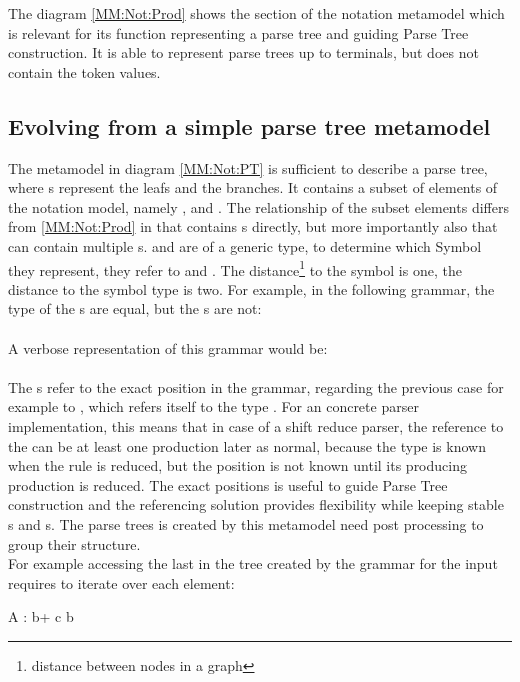 The diagram \ref{MM:Not:Prod} shows the section of the notation metamodel which is relevant for its function representing a parse tree and guiding Parse Tree construction. It is able to represent parse trees up to terminals, but does not contain the token values.\\

\subsection{Evolving from a simple parse tree metamodel}The metamodel in diagram \ref{MM:Not:PT} is sufficient to describe a parse tree, where s represent the leafs and  the branches. It contains a subset of elements of the notation model, namely ,  and . The relationship of the subset elements differs from \ref{MM:Not:Prod} in that  contains s directly, but more importantly also that  can contain multiple s.  and  are of a generic type, to determine which Symbol they represent, they refer to  and . The distance\footnote{\raggedright distance between nodes in a graph} to the symbol is one, the distance to the symbol type is two. 
For example, in the following grammar, the type of the s are equal, but the s are not:\\
 \\
A verbose representation of this grammar would be: \\
 \\
The s refer to the exact position in the grammar, regarding the previous case for example to , which refers itself to the type . For an concrete parser implementation, this means that in case of a shift reduce parser, the reference to the  can be at least one production later as normal, because the type is known when the rule is reduced, but the position is not known until its producing production is reduced. The exact positions is useful to guide Parse Tree construction and the referencing solution provides flexibility while keeping stable s and s. The parse trees is created by this metamodel need post processing to group their structure. \\
For example accessing the last  in the tree created by the grammar for the input  requires to iterate over each element:\\
\begin{xtxt}
A : b+ c b 
\end{xtxt}


